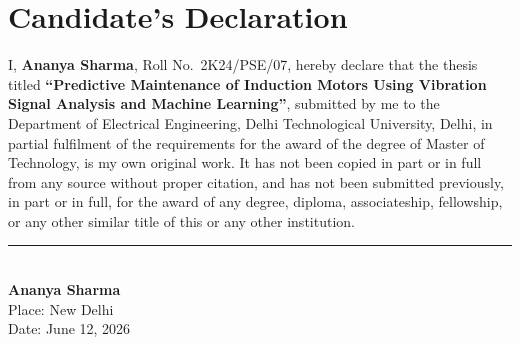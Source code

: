 \chapter*{Candidate's Declaration}

I, \textbf{Ananya Sharma}, Roll No.\ 2K24/PSE/07, hereby declare that the thesis titled
\textbf{``Predictive Maintenance of Induction Motors Using Vibration Signal Analysis and Machine
Learning''}, submitted by me to the Department of Electrical Engineering, Delhi Technological
University, Delhi, in partial fulfilment of the requirements for the award of the degree of
Master of Technology, is my own original work. It has not been copied in part or in full from
any source without proper citation, and has not been submitted previously, in part or in full,
for the award of any degree, diploma, associateship, fellowship, or any other similar title of
this or any other institution.

\vspace{2cm}
\begin{flushright}
\rule{5cm}{0.4pt}\\
\textbf{Ananya Sharma}\\
Place: New Delhi\\
Date: June 12, 2026
\end{flushright}


